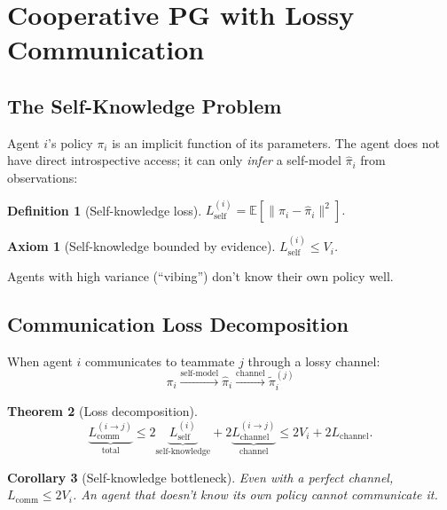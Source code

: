 \documentclass[11pt,a4paper]{article}
\newtheorem{theorem}{Theorem}[section]
\newtheorem{corollary}[theorem]{Corollary}
\newtheorem{definition}[theorem]{Definition}
\newtheorem{axiom_}{Axiom}[section]
\newcommand{\E}{\mathbb{E}}
\newcommand{\norm}[1]{\|#1\|}
\begin{document}
\section{Cooperative PG with Lossy Communication}\label{sec:coop}

\subsection{The Self-Knowledge Problem}

Agent $i$'s policy $\pi_i$ is an implicit function of its parameters.
The agent does not have direct introspective access; it can only
\emph{infer} a self-model $\hat{\pi}_i$ from observations:

\begin{definition}[Self-knowledge loss]
$L_{\text{self}}^{(i)} = \E[\norm{\pi_i - \hat{\pi}_i}^2]$.
\end{definition}

\begin{axiom_}[Self-knowledge bounded by evidence]
$L_{\text{self}}^{(i)} \leq V_i$.
\end{axiom_}

Agents with high variance (``vibing'') don't know their own policy well.

\subsection{Communication Loss Decomposition}

When agent $i$ communicates to teammate $j$ through a lossy channel:
\begin{equation}
    \pi_i \xrightarrow{\text{self-model}} \hat{\pi}_i
    \xrightarrow{\text{channel}} \tilde{\pi}_i^{(j)}
\end{equation}

\begin{theorem}[Loss decomposition]\label{thm:comm-loss}
\begin{equation}
    \underbrace{L_{\text{comm}}^{(i \to j)}}_{\text{total}}
    \leq 2\underbrace{L_{\text{self}}^{(i)}}_{\text{self-knowledge}}
    + 2\underbrace{L_{\text{channel}}^{(i \to j)}}_{\text{channel}}
    \leq 2V_i + 2L_{\text{channel}}.
\end{equation}
\end{theorem}

\begin{corollary}[Self-knowledge bottleneck]
Even with a perfect channel, $L_{\text{comm}} \leq 2V_i$.
An agent that doesn't know its own policy cannot communicate it.
\end{corollary}
\end{document}
